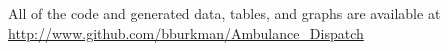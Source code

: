 \documentclass[fleqn]{cas-sc}
\begin{document}
All of the code and generated data, tables, and graphs are available at 
\url{http://www.github.com/bburkman/Ambulance_Dispatch}




\begin{comment}
\begin{figure}[<options>]
	\centering
		\texttt{[image: ]}
	  \caption{}\label{fig1}
\end{figure}


\begin{table}[<options>]
\caption{}\label{tbl1}
\begin{tabular*}{\tblwidth}{@{}LL@{}}
\toprule
  &  \\ %
\midrule
 & \\
 & \\
 & \\
 & \\
\bottomrule
\end{tabular*}
\end{table}
\end{comment}





\printcredits

%




\begin{comment}
\bio{}
\endbio

\bio{pic1}
\endbio
\end{comment}
\end{document}
